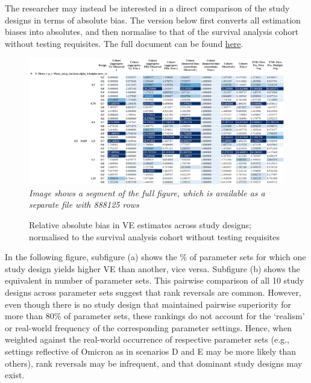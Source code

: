 \documentclass[12pt]{article}
\begin{document}
The researcher may instead be interested in a direct comparison of the study designs in terms of absolute bias. The version below first converts all estimation biases into absolutes, and then normalise to that of the survival analysis cohort without testing requisites. The full document can be found \href{https://www.dropbox.com/sh/7sxgwfymrbkexb9/AADc4E3wb-FEsMr7SMIRqH4Ba?dl=0}{here}.
\begin{figure}[H]
	\centering
	\caption{Relative absolute bias in VE estimates across study designs; normalised to the survival analysis cohort without testing requisites}
	\includegraphics[scale=0.3]{VEMethod_Sim1b_Parallel_NoCI_Wide_Relative_Absolute_Gradient_SAMPLE} \\ 
	\textit{\small *Image shows a segment of the full figure, which is available as a separate file with 888125 rows}
\end{figure}

In the following figure, subfigure (a) shows the \% of parameter sets for which one study design yields higher VE than another, vice versa. Subfigure (b) shows the equivalent in number of parameter sets. This pairwise comparison of all 10 study designs across parameter sets suggest that rank reversals are common. However, even though there is no study design that maintained pairwise superiority for more than 80\% of parameter sets, these rankings do not account for the `realism' or real-world frequency of the corresponding parameter settings. Hence, when weighted against the real-world occurrence of respective parameter sets (e.g., settings reflective of Omicron as in scenarios D and E may be more likely than others), rank reversals may be infrequent, and that dominant study designs may exist.
\end{document}
